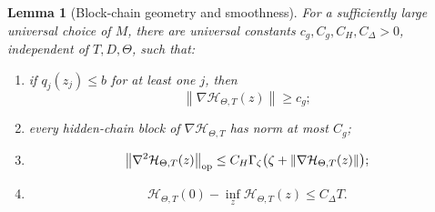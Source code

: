 \documentclass[11pt,a4paper]{article}
\newcommand{\norm}[1]{\left\lVert #1\right\rVert}
\newtheorem{lemma}[theorem]{Lemma}
\theoremstyle{remark}
\begin{document}
\begin{lemma}[Block-chain geometry and smoothness]
\label{lem:block-chain-geometry}
For a sufficiently large universal choice of $M$, there are universal
constants $c_g,C_g,C_H,C_\Delta>0$, independent of $T,D,\Theta$, such that:
\begin{enumerate}
\item if $q_j(z_j)\le b$ for at least one $j$, then
\begin{equation}
 \norm{\nabla\mathcal H_{\Theta,T}(z)}\ge c_g;
 \label{eq:block-gradient-obstruction}
\end{equation}
\item every hidden-chain block of $\nabla\mathcal H_{\Theta,T}$ has norm at
most $C_g$;
\item
\begin{equation}
 \norm{\nabla^2\mathcal H_{\Theta,T}(z)}_{\rm op}
 \le C_H\Gamma_\zeta
 \bigl(\zeta+\norm{\nabla\mathcal H_{\Theta,T}(z)}\bigr);
 \label{eq:block-generalized-certificate}
\end{equation}
\item
\begin{equation}
 \mathcal H_{\Theta,T}(0)-\inf_z\mathcal H_{\Theta,T}(z)
 \le C_\Delta T.
 \label{eq:block-chain-gap}
\end{equation}
\end{enumerate}
\end{lemma}
\end{document}
